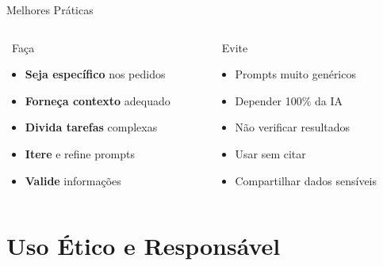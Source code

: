 \documentclass[aspectratio=169,12pt]{beamer}
\begin{document}
\begin{frame}{Melhores Práticas}
    \begin{columns}
        \begin{column}{0.5\textwidth}
            \begin{block}{\faCheckCircle\, Faça}
                \begin{itemize}
                    \item \textbf{Seja específico} nos pedidos
                    \item \textbf{Forneça contexto} adequado
                    \item \textbf{Divida tarefas} complexas
                    \item \textbf{Itere} e refine prompts
                    \item \textbf{Valide} informações
                \end{itemize}
            \end{block}
        \end{column}
        \begin{column}{0.5\textwidth}
            \begin{alertblock}{\faTimesCircle\, Evite}
                \begin{itemize}
                    \item Prompts muito genéricos
                    \item Depender 100\% da IA
                    \item Não verificar resultados
                    \item Usar sem citar
                    \item Compartilhar dados sensíveis
                \end{itemize}
            \end{alertblock}
        \end{column}
    \end{columns}
\end{frame}


\section{Uso Ético e Responsável}
\end{document}
